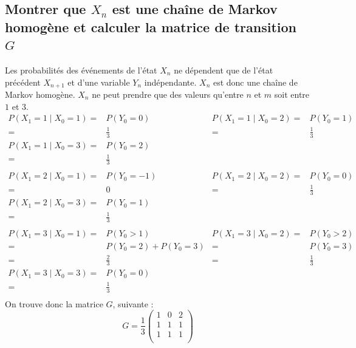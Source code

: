 \documentclass[10pt,a4paper,twoside]{article}
\begin{document}
\subsection{Montrer que $X_{n}$ est une chaîne de Markov homogène et calculer la matrice de transition $G$}
Les probabilités des événements de l'état $X_{n}$ ne dépendent que de l'état précédent $X_{n+1}$ et d'une variable $Y_{n}$ indépendante. $X_{n}$ est donc une chaîne de Markov homogène. $X_{n}$ ne peut prendre que des valeurs qu'entre $n$ et $m$ soit entre $1$ et $3$.
\begin{align*}
P(X_{1}=1\mid X_{0}=1) =& P(Y_{0} = 0) & P(X_{1}=1\mid X_{0}=2) =& P(Y_{0} = 1)\\
=& \frac{1}{3} & =& \frac{1}{3}\\
P(X_{1}=1 \mid X_{0}=3) =& P(Y_{0} = 2)\\
=& \frac{1}{3} \\
\\
P(X_{1}=2\mid X_{0}=1) =& P(Y_{0} = -1) & P(X_{1}=2\mid X_{0}=2) =& P(Y_{0} = 0)\\
=& 0 & =& \frac{1}{3}\\
P(X_{1}=2\mid X_{0}=3) =& P(Y_{0} = 1)\\
=& \frac{1}{3} \\
\\
P(X_{1}=3\mid X_{0}=1) =& P(Y_{0} > 1) & P(X_{1}=3\mid X_{0}=2) =& P(Y_{0} > 2)\\
=& P(Y_{0}=2) + P(Y_{0}=3) & =& P(Y_{0}=3)\\
=& \frac{2}{3} & =& \frac{1}{3}\\
P(X_{1}=3\mid X_{0}=3) =& P(Y_{0} = 0)\\
=& \frac{1}{3} \\
\end{align*}
On trouve donc la matrice $G$, suivante :
\[ G=\frac{1}{3}\left(\begin{array}{ccc}
1 & 0 & 2\\
1 & 1 & 1\\
1 & 1 & 1\\
\end{array}\right)\]
\end{document}
